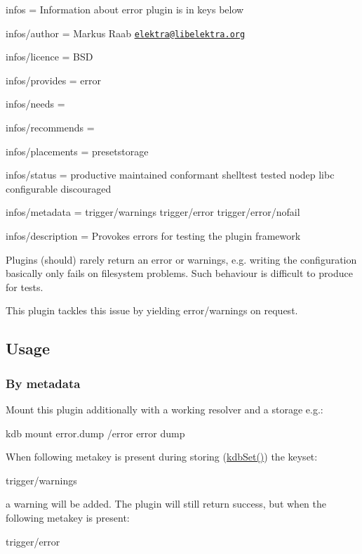 
\begin{DoxyItemize}
\item infos = Information about error plugin is in keys below
\item infos/author = Markus Raab \href{mailto:elektra@libelektra.org}{\tt elektra@libelektra.\+org}
\item infos/licence = B\+S\+D
\item infos/provides = error
\item infos/needs =
\item infos/recommends =
\item infos/placements = presetstorage
\item infos/status = productive maintained conformant shelltest tested nodep libc configurable discouraged
\item infos/metadata = trigger/warnings trigger/error trigger/error/nofail
\item infos/description = Provokes errors for testing the plugin framework
\end{DoxyItemize}

Plugins (should) rarely return an error or warnings, e.\+g. writing the configuration basically only fails on filesystem problems. Such behaviour is difficult to produce for tests.

This plugin tackles this issue by yielding error/warnings on request.

\subsection*{Usage}

\subsubsection*{By metadata}

Mount this plugin additionally with a working resolver and a storage e.\+g.\+: \begin{DoxyVerb}kdb mount error.dump /error error dump
\end{DoxyVerb}


When following metakey is present during storing ({\ttfamily \hyperlink{group__kdb_ga11436b058408f83d303ca5e996832bcf}{kdb\+Set()}}) the keyset\+: \begin{DoxyVerb}trigger/warnings
\end{DoxyVerb}


a warning will be added. The plugin will still return success, but when the following metakey is present\+: \begin{DoxyVerb}trigger/error
\end{DoxyVerb}


